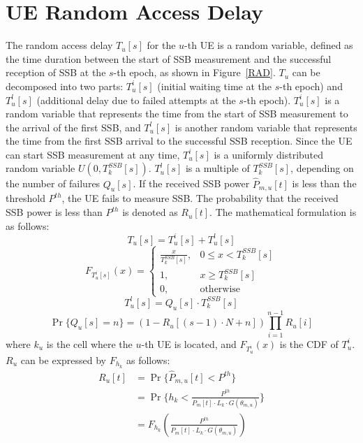 \section{UE Random Access Delay}
The random access delay $T_u[s]$ for the $u$-th UE is a random variable, defined as the time duration between the start of SSB measurement and the successful reception of SSB at the $s$-th epoch, as shown in Figure~\ref{RAD}. $T_u$ can be decomposed into two parts: $T_u^i[s]$ (initial waiting time at the $s$-th epoch) and $T_u^l[s]$ (additional delay due to failed attempts at the $s$-th epoch). $T_u^i[s]$ is a random variable that represents the time from the start of SSB measurement to the arrival of the first SSB, and $T_u^l[s]$ is another random variable that represents the time from the first SSB arrival to the successful SSB reception. Since the UE can start SSB measurement at any time, $T_u^i[s]$ is a uniformly distributed random variable $U(0, T_{k}^{SSB}[s])$. $T_u^l[s]$ is a multiple of $T_{k}^{SSB}[s]$, depending on the number of failures $Q_u[s]$. If the received SSB power $\hat{P}_{m, u}[t]$ is less than the threshold $P^{th}$, the UE fails to measure SSB. The probability that the received SSB power is less than $P^{th}$ is denoted as $R_u[t]$. The mathematical formulation is as follows:
\begin{equation}
    T_u[s] = T_u^i[s] + T_u^l[s]
\end{equation}
\begin{equation}
    F_{T_u^i[s]}(x) =
    \begin{cases}
        \frac{x}{T_{k}^{SSB}[s]}, & 0 \leq x < T_{k}^{SSB}[s] \\
        1, & x \geq T_{k}^{SSB}[s] \\
        0, & \text{otherwise}
    \end{cases}
\end{equation}
\begin{equation}
    T_u^l[s] = Q_u[s] \cdot T_{k}^{SSB}[s]
\end{equation}
\begin{equation}
    \Pr\{Q_u[s] = n\} = (1 - R_u[(s-1) \cdot N + n]) \prod_{i=1}^{n-1} R_u[i] 
\end{equation}
where $k_u$ is the cell where the $u$-th UE is located, and $F_{T_u^i}(x)$ is the CDF of $T_u^i$. $R_u$ can be expressed by $F_{h_k}$ as follows:
\begin{equation}
    \begin{aligned}
        R_u[t]
        &= \Pr\{\hat{P}_{m, u}[t] < P^{th}\} \\
        &= \Pr\{h_k < \frac{P^{th}}{P_m[t] \cdot L_k \cdot G(\theta_{m, u})}\} \\
        &= F_{h_k}(\frac{P^{th}}{P_m[t] \cdot L_k \cdot G(\theta_{m, u})})
    \end{aligned}
\end{equation}

